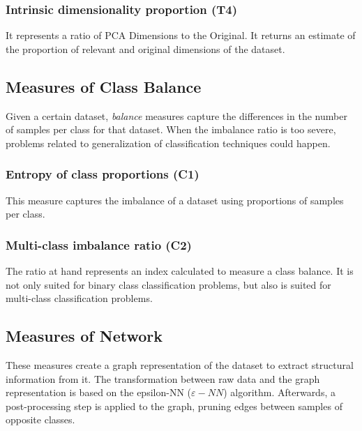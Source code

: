 \subsubsection{Intrinsic dimensionality proportion (T4)}

It represents a ratio of PCA Dimensions to the Original. It returns an estimate 
of the proportion of relevant and original dimensions of the dataset.

\subsection{Measures of Class Balance}\label{sec:balance}

Given a certain dataset, \textit{balance} measures capture the differences in
the number of samples per class for that dataset. When the imbalance ratio is 
too severe, problems related to generalization of classification techniques 
could happen.

\subsubsection{Entropy of class proportions (C1)}

This measure captures the imbalance of a dataset using proportions of 
samples per class.

\subsubsection{Multi-class imbalance ratio (C2)}

The ratio at hand represents an index calculated to measure a class balance.
It is not only suited for binary class classification problems, but also is  
suited for multi-class classification problems.

\subsection{Measures of Network}\label{sec:network}

These measures create a graph representation of the dataset to extract 
structural information from it. The transformation between raw data and the
graph representation is based on the epsilon-NN ($\varepsilon-NN$) algorithm.
Afterwards, a post-processing step is applied to the graph, pruning edges
between samples of opposite classes.

